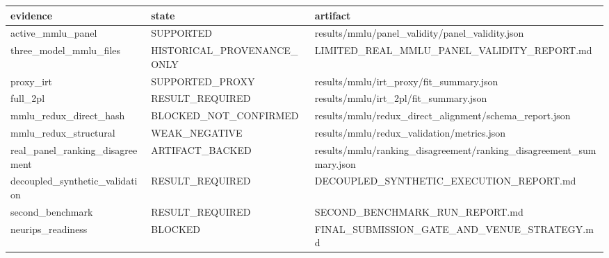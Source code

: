 \begin{tabular}{lll}
\toprule
evidence & state & artifact \\
\midrule
active\_mmlu\_panel & SUPPORTED & results/mmlu/panel\_validity/panel\_validity.json \\
three\_model\_mmlu\_files & HISTORICAL\_PROVENANCE\_ONLY & LIMITED\_REAL\_MMLU\_PANEL\_VALIDITY\_REPORT.md \\
proxy\_irt & SUPPORTED\_PROXY & results/mmlu/irt\_proxy/fit\_summary.json \\
full\_2pl & RESULT\_REQUIRED & results/mmlu/irt\_2pl/fit\_summary.json \\
mmlu\_redux\_direct\_hash & BLOCKED\_NOT\_CONFIRMED & results/mmlu/redux\_direct\_alignment/schema\_report.json \\
mmlu\_redux\_structural & WEAK\_NEGATIVE & results/mmlu/redux\_validation/metrics.json \\
real\_panel\_ranking\_disagreement & ARTIFACT\_BACKED & results/mmlu/ranking\_disagreement/ranking\_disagreement\_summary.json \\
decoupled\_synthetic\_validation & RESULT\_REQUIRED & DECOUPLED\_SYNTHETIC\_EXECUTION\_REPORT.md \\
second\_benchmark & RESULT\_REQUIRED & SECOND\_BENCHMARK\_RUN\_REPORT.md \\
neurips\_readiness & BLOCKED & FINAL\_SUBMISSION\_GATE\_AND\_VENUE\_STRATEGY.md \\
\bottomrule
\end{tabular}
